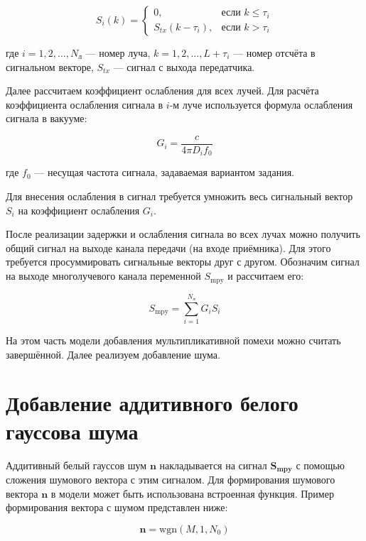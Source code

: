 \begin{equation}
S_i(k) = 
\begin{cases}
0, & \text{если } k \leq \tau_i \\
S_{tx}(k - \tau_i), & \text{если } k > \tau_i
\end{cases}
\end{equation}

где $i = 1, 2, \ldots, N_{\text{л}}$ — номер луча, $k = 1, 2, \ldots, L + \tau_i$ — номер отсчёта в сигнальном векторе, $S_{tx}$ — сигнал с выхода передатчика.

Далее рассчитаем коэффициент ослабления для всех лучей. Для расчёта коэффициента ослабления сигнала в $i$-м луче используется формула ослабления сигнала в вакууме:

\begin{equation}
G_i = \frac{c}{4 \pi D_i f_0}
\end{equation}

где $f_0$ — несущая частота сигнала, задаваемая вариантом задания.

Для внесения ослабления в сигнал требуется умножить весь сигнальный вектор $S_i$ на коэффициент ослабления $G_i$.

После реализации задержки и ослабления сигнала во всех лучах можно получить общий сигнал на выходе канала передачи (на входе приёмника). Для этого требуется просуммировать сигнальные векторы друг с другом. Обозначим сигнал на выходе многолучевого канала переменной $S_{\text{mpy}}$ и рассчитаем его:

\begin{equation}
S_{\text{mpy}} = \sum_{i=1}^{N_{\text{л}}} G_i S_i
\end{equation}

На этом часть модели добавления мультипликативной помехи можно считать завершённой. Далее реализуем добавление шума.

\section{Добавление аддитивного белого гауссова шума}

Аддитивный белый гауссов шум $\mathbf{n}$ накладывается на сигнал $\mathbf{S_{\text{mpy}}}$ с помощью сложения шумового вектора с этим сигналом. Для формирования шумового вектора $\mathbf{n}$ в модели может быть использована встроенная функция. Пример формирования вектора с шумом представлен ниже:

\begin{equation}
\mathbf{n} = \text{wgn}(M, 1, N_0)
\end{equation}

